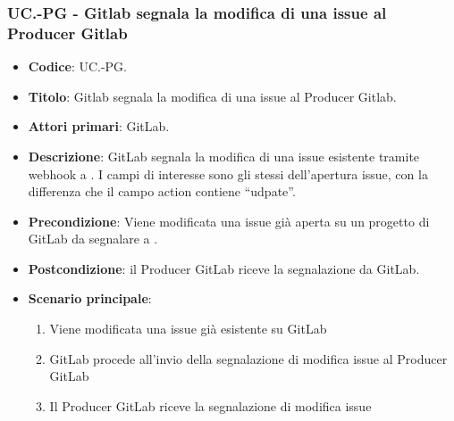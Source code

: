 
\subsubsection{UC\theuccount.\thesubuccount-PG - Gitlab segnala la modifica di una issue al Producer Gitlab}
\begin{itemize}
    \item \textbf{Codice}: UC\theuccount.\thesubuccount-PG.
    \item \textbf{Titolo}: Gitlab segnala la modifica di una issue al Producer Gitlab.
    \item \textbf{Attori primari}: GitLab.
    \item \textbf{Descrizione}: GitLab segnala la modifica di una issue esistente tramite webhook a
    \newline \progetto.
    I campi di interesse sono gli stessi dell'apertura issue, con la differenza che il campo action contiene ``udpate''.
    \item \textbf{Precondizione}: Viene modificata una issue già aperta su un
    progetto di GitLab da segnalare a \progetto.
    \item \textbf{Postcondizione}: il Producer GitLab riceve la segnalazione da GitLab.
    \item \textbf{Scenario principale}:
    \begin{enumerate}
        \item Viene modificata una issue già esistente su GitLab
        \item GitLab procede all'invio della segnalazione di modifica issue al Producer GitLab
        \item Il Producer GitLab riceve la segnalazione di modifica issue
    \end{enumerate}

\end{itemize}


